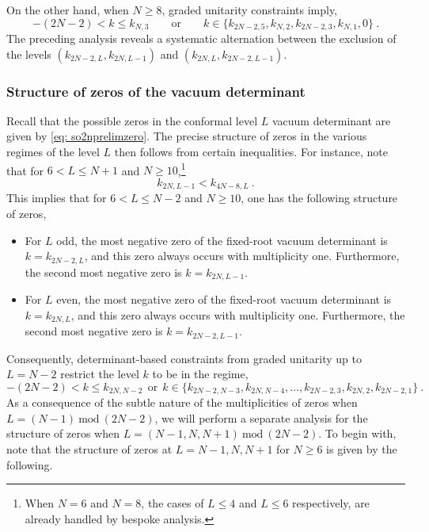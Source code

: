 On the other hand, when $N \geqslant 8$, graded unitarity constraints imply,
\begin{equation}
    -(2N-2) < k \leqslant k_{N,3} \qquad \text{or} \qquad k \in \{k_{2N-2,5}, k_{N,2}, k_{2N-2,3}, k_{N,1}, 0\}~. 
\end{equation}
The preceding analysis reveals a systematic alternation between the exclusion of the levels $(k_{2N-2,L}, k_{2N,L-1})$ and $(k_{2N,L}, k_{2N-2,L-1})$. 

\subsubsection{Structure of zeros of the vacuum determinant} \label{sec:soevenstruczero}
Recall that the possible zeros in the conformal level $L$ vacuum determinant are given by \eqref{eq: so2nprelimzero}. The precise structure of zeros in the various regimes of the level $L$ then follows from certain inequalities. For instance, note that for $6 < L \leqslant N+1$ and $N \geqslant 10$,\footnote{When $N = 6$ and $N = 8$, the cases of $L \leqslant 4$ and $L \leqslant 6$ respectively, are already handled by bespoke analysis.} 
\begin{equation} \label{eq:soevenstr1}
    k_{2N, L-1} < k_{4N-8, L}~.
\end{equation}
This implies that for $6 < L \leqslant N-2$ and $N \geqslant 10$, one has the following structure of zeros,
\begin{itemize}
    \item For $L$ odd, the most negative zero of the fixed-root vacuum determinant is $k = k_{2N-2,L}$, and this zero always occurs with multiplicity one. Furthermore, the second most negative zero is $k = k_{2N,L-1}$.
    \item For $L$ even, the most negative zero of the fixed-root vacuum determinant is $k = k_{2N,L}$, and this zero always occurs with multiplicity one. Furthermore, the second most negative zero is $k = k_{2N-2,L-1}$.
\end{itemize}
Consequently, determinant-based constraints from graded unitarity up to $L = N-2$ restrict the level $k$ to be in the regime,
\begin{equation} \label{eq:constSOevenuptoNm2}
    -(2N-2) < k \leqslant k_{2N, N-2} \ \ \text{or} \ \ k \in \{k_{2N-2, N-3}, k_{2N, N-4}, \ldots, k_{2N-2, 3}, k_{2N, 2}, k_{2N-2,1}\}~.
\end{equation}
As a consequence of the subtle nature of the multiplicities of zeros when $L = (N-1)~\text{mod}~(2N-2)$, we will perform a separate analysis for the structure of zeros when $L = (N-1,N,N+1)~\text{mod}~(2N-2)$. To begin with, note that the structure of zeros at $L = N-1, N, N+1$ for $N \geqslant 6$ is given by the following.
